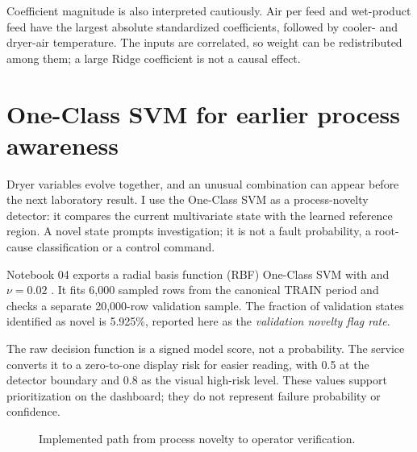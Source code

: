 Coefficient magnitude is also interpreted cautiously. Air per feed and wet-product feed have the largest absolute standardized coefficients, followed by cooler- and dryer-air temperature. The inputs are correlated, so weight can be redistributed among them; a large Ridge coefficient is not a causal effect.

\section{One-Class SVM for earlier process awareness}

Dryer variables evolve together, and an unusual combination can appear before the next laboratory result. I use the One-Class SVM as a process-novelty detector: it compares the current multivariate state with the learned reference region. A novel state prompts investigation; it is not a fault probability, a root-cause classification or a control command.

Notebook 04 exports a radial basis function (RBF) One-Class SVM with  and $\nu=0.02$ \cite{anomalynotebook}. It fits 6,000 sampled rows from the canonical TRAIN period and checks a separate 20,000-row validation sample. The fraction of validation states identified as novel is 5.925\%, reported here as the \emph{validation novelty flag rate}.

The raw decision function is a signed model score, not a probability. The service converts it to a zero-to-one display risk for easier reading, with 0.5 at the detector boundary and 0.8 as the visual high-risk level. These values support prioritization on the dashboard; they do not represent failure probability or confidence.

\begin{figure}[htbp]
\centering
{}
\caption{Implemented path from process novelty to operator verification.}
\label{fig:novelty-workflow}
\end{figure}

